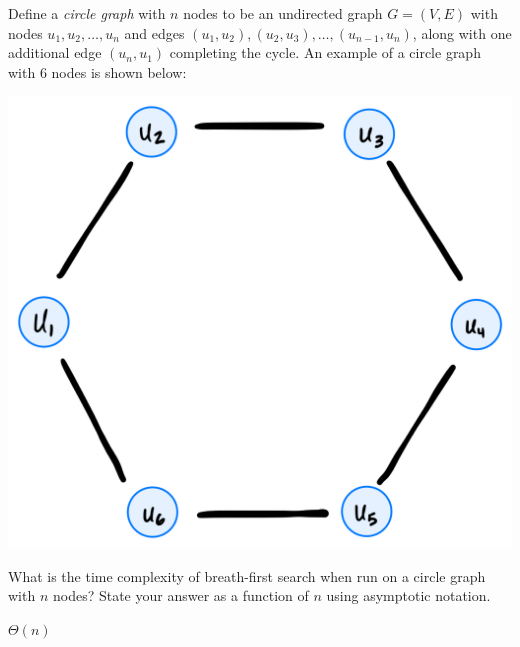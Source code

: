 \begin{prob}
    Define a \textit{circle graph} with $n$ nodes to be an undirected graph $G =
    (V, E)$ with nodes $u_1, u_2, \ldots, u_n$ and edges $(u_1, u_2), (u_2,
    u_3), \ldots, (u_{n-1}, u_n)$, along with one additional edge $(u_n, u_1)$
    completing the cycle. An example of a circle graph with 6 nodes is shown
    below:

    \includegraphics{./graph.png}

    What is the time complexity of breath-first search when run on a circle
    graph with $n$ nodes? State your answer as a function of $n$ using
    asymptotic notation.

    \begin{soln}
        $\Theta(n)$
    \end{soln}

\end{prob}
